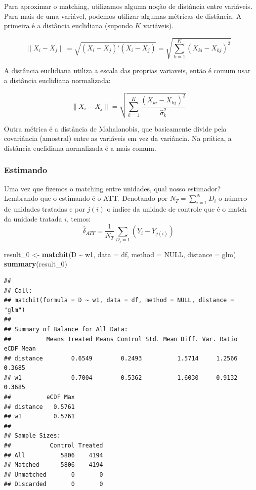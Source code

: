 \documentclass[
]{article}
\newenvironment{Shaded}{\begin{snugshade}}{\end{snugshade}}
\newcommand{\AttributeTok}[1]{\textcolor[rgb]{0.13,0.29,0.53}{#1}}
\newcommand{\ConstantTok}[1]{\textcolor[rgb]{0.56,0.35,0.01}{#1}}
\newcommand{\FunctionTok}[1]{\textcolor[rgb]{0.13,0.29,0.53}{\textbf{#1}}}
\newcommand{\NormalTok}[1]{#1}
\newcommand{\OtherTok}[1]{\textcolor[rgb]{0.56,0.35,0.01}{#1}}
\newcommand{\SpecialCharTok}[1]{\textcolor[rgb]{0.81,0.36,0.00}{\textbf{#1}}}
\newcommand{\StringTok}[1]{\textcolor[rgb]{0.31,0.60,0.02}{#1}}
\begin{document}
Para aproximar o matching, utilizamos alguma noção de distância entre variáveis. Para mais de uma variável, podemos utilizar algumas métricas de distância. A primeira é a distância euclidiana (supondo \(K\) variáveis).

\[
\lVert X_i - X_j \rVert = \sqrt{(X_i - X_j)'(X_i - X_j)} = \sqrt{\sum_{k=1}^K(X_{ki} - X_{kj})^2}
\]

A distância euclidiana utiliza a escala das proprias variaveis, então é comum usar a distância euclidiana normalizada:

\[
\lVert X_i - X_j \rVert = \sqrt{\sum_{k=1}^K\frac{(X_{ki} - X_{kj})^2}{\hat{\sigma}_k^2}}
\]

Outra métrica é a distância de Mahalanobis, que basicamente divide pela covariância (amostral) entre as variáveis em vez da variância. Na prática, a distância euclidiana normalizada é a mais comum.

\subsubsection{Estimando}\label{estimando-1}

Uma vez que fizemos o matching entre unidades, qual nosso estimador? Lembrando que o estimando é o ATT. Denotando por \(N_T = \sum_{i=1}^N D_i\) o número de unidades tratadas e por \(j(i)\) o índice da unidade de controle que é o match da unidade tratada \(i\), temos:
\[
\widehat{\delta}_{ATT} = \dfrac{1}{N_T} \sum_{D_i=1} (Y_i - Y_{j(i)})
\]

\begin{Shaded}
\begin{Highlighting}[]
\NormalTok{result\_0 }\OtherTok{\textless{}{-}} \FunctionTok{matchit}\NormalTok{(D }\SpecialCharTok{\textasciitilde{}}\NormalTok{ w1, }\AttributeTok{data =}\NormalTok{ df, }\AttributeTok{method =} \ConstantTok{NULL}\NormalTok{, }\AttributeTok{distance =} \StringTok{\textquotesingle{}glm\textquotesingle{}}\NormalTok{)}
\FunctionTok{summary}\NormalTok{(result\_0)}
\end{Highlighting}
\end{Shaded}

\begin{verbatim}
## 
## Call:
## matchit(formula = D ~ w1, data = df, method = NULL, distance = "glm")
## 
## Summary of Balance for All Data:
##          Means Treated Means Control Std. Mean Diff. Var. Ratio eCDF Mean
## distance        0.6549        0.2493          1.5714     1.2566    0.3685
## w1              0.7004       -0.5362          1.6030     0.9132    0.3685
##          eCDF Max
## distance   0.5761
## w1         0.5761
## 
## Sample Sizes:
##           Control Treated
## All          5806    4194
## Matched      5806    4194
## Unmatched       0       0
## Discarded       0       0
\end{verbatim}
\end{document}
